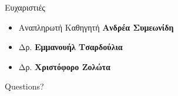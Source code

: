 \documentclass{beamer}
\def\textenglish{}
\newcommand{\en}[1]{\textenglish{#1}}
\begin{document}
\begin{frame}{Ευχαριστιές}
    \begin{itemize}
        \item Αναπληρωτή Καθηγητή \textbf{Ανδρέα Συμεωνίδη}
        \item Δρ. \textbf{Εμμανουήλ Τσαρδούλια}
        \item Δρ. \textbf{Χριστόφορο Ζολώτα}
    \end{itemize}
\end{frame}

\begin{frame}[standout]
    \en{Questions?}
\end{frame}
\end{document}
